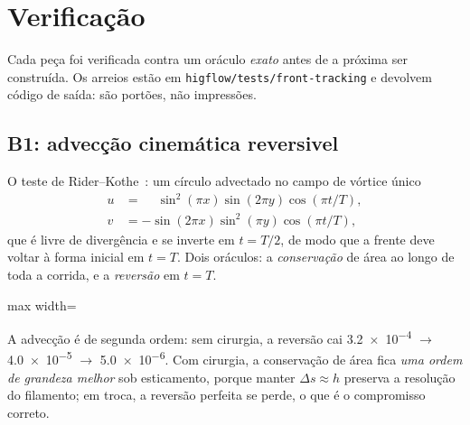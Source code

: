 \section{Verifica\c{c}\~ao}
\label{sec:verificacao}

Cada pe\c{c}a foi verificada contra um or\'aculo \emph{exato} antes de a
pr\'oxima ser constru\'ida. Os arreios est\~ao em
\texttt{higflow/\allowbreak{}tests/\allowbreak{}front-\allowbreak{}tracking} e devolvem c\'odigo de sa\'ida: s\~ao
port\~oes, n\~ao impress\~oes.

\subsection{B1: advec\c{c}\~ao cinem\'atica reversivel}
\label{sec:b1}

O teste de Rider--Kothe~\cite{rider1998}: um c\'irculo advectado no campo de
v\'ortice \'unico
\begin{align}
  u &= \phantom{-}\sin^{2}(\pi x)\sin(2\pi y)\cos(\pi t/T),\\
  v &= -\sin(2\pi x)\sin^{2}(\pi y)\cos(\pi t/T),
\end{align}
que \'e livre de diverg\^encia e se inverte em $t=T/2$, de modo que a frente deve
voltar \`a forma inicial em $t=T$. Dois or\'aculos: a \emph{conserva\c{c}\~ao} de
\'area ao longo de toda a corrida, e a \emph{revers\~ao} em $t=T$.

\begin{adjustbox}{max width=\linewidth}
\end{adjustbox}

A advec\c{c}\~ao \'e de segunda ordem: sem cirurgia, a revers\~ao cai
\num{3.2e-4} $\to$ \num{4.0e-5} $\to$ \num{5.0e-6}. Com cirurgia, a
conserva\c{c}\~ao de \'area fica \emph{uma ordem de grandeza melhor} sob
esticamento, porque manter $\Delta s \approx h$ preserva a resolu\c{c}\~ao do
filamento; em troca, a revers\~ao perfeita se perde, o que \'e o compromisso
correto.


